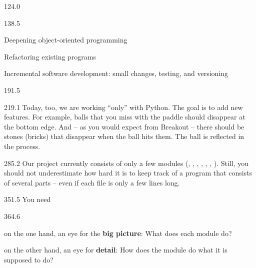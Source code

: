 \documentclass{aslab}
\begin{document}
\maketitleblock

\begin{region}{124.0}
\end{region}

\begin{region}[pitch=13]{138.5}
{\color{aslabblue}\bfseries
\begin{dashlist}
\item Deepening object-oriented programming
\item Refactoring existing programs
\item Incremental software development: small changes, testing, and versioning
\end{dashlist}\par}
\end{region}

\begin{region}{191.5}
\end{region}

\begin{region}[pitch=13.17]{219.1}
Today, too, we are working ``only'' with Python. The goal is to add new
features. For example, balls that you miss with the paddle should disappear at
the bottom edge. And -- as you would expect from Breakout -- there should be
stones (bricks) that disappear when the ball hits them. The ball is reflected
in the process.
\end{region}

\begin{region}[pitch=13.3]{285.2}
Our project currently consists of only a few modules (,
, , , ,
, ). Still, you should not underestimate how
hard it is to keep track of a program that consists of several parts -- even
if each file is only a few lines long.
\end{region}

\begin{region}{351.5}
You need
\end{region}

\begin{region}[pitch=14.3]{364.6}
\begin{dashlist}
\item on the one hand, an eye for the \textbf{big picture}: What does each
  module do?
\item on the other hand, an eye for \textbf{detail}: How does the module do
  what it is supposed to do?
\end{dashlist}
\end{region}
\end{document}
